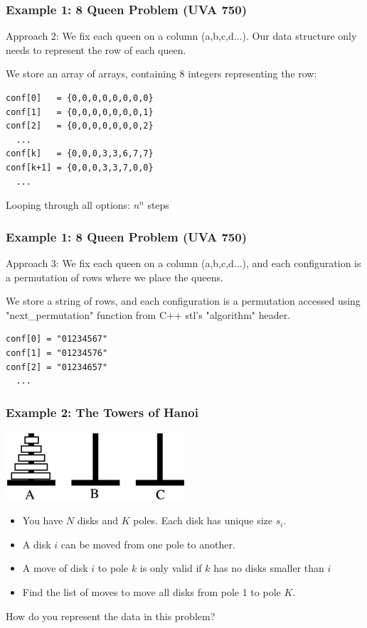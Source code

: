 \begin{frame}[fragile]
  \frametitle{Example 1: 8 Queen Problem (UVA 750)}
  Approach 2: We fix each queen on a column (a,b,c,d...). Our data structure only needs to represent the row of each queen. \bigskip

  We store an array of arrays, containing 8 integers representing the row:\bigskip
\begin{verbatim}
conf[0]   = {0,0,0,0,0,0,0,0}
conf[1]   = {0,0,0,0,0,0,0,1}
conf[2]   = {0,0,0,0,0,0,0,2}
  ...
conf[k]   = {0,0,0,3,3,6,7,7}
conf[k+1] = {0,0,0,3,3,7,0,0}
  ...
\end{verbatim}
Looping through all options: $n^n$ steps
\end{frame}

\begin{frame}[fragile]
  \frametitle{Example 1: 8 Queen Problem (UVA 750)}
  Approach 3: We fix each queen on a column (a,b,c,d...), and each configuration
  is a permutation of rows where we place the queens. \bigskip

  We store a string of rows, and each configuration is a permutation accessed using "next\_permutation" function from C++ stl's "algorithm" header. \bigskip

\begin{verbatim}
conf[0] = "01234567"
conf[1] = "01234576"
conf[2] = "01234657"
  ...
\end{verbatim}
\end{frame}

\begin{frame}
  \frametitle{Example 2: The Towers of Hanoi}

  \begin{center}
    \includegraphics[width=0.5\textwidth]{img/hanoi}
  \end{center}
  \medskip

  {\small
    \begin{itemize}
    \item You have $N$ disks and $K$ poles. Each disk has unique size $s_i$.
    \item A disk $i$ can be moved from one pole to another.
    \item A move of disk $i$ to pole $k$ is only valid if $k$ has no disks smaller than $i$
    \item Find the list of moves to move all disks from pole 1 to pole $K$.
    \end{itemize}
  }

  \vfill

  How do you represent the data in this problem?
\end{frame}

